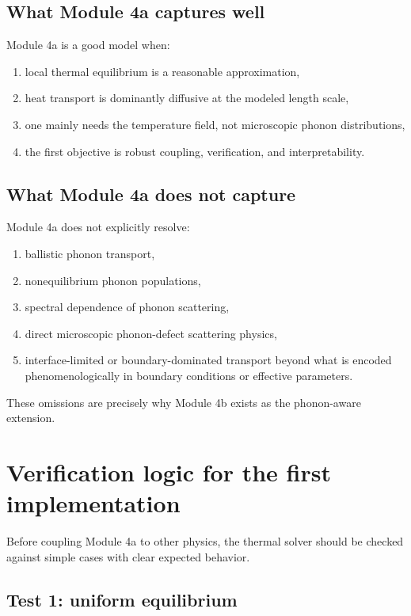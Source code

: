 \documentclass[11pt]{article}
\begin{document}
\subsection{What Module 4a captures well}

Module 4a is a good model when:
\begin{enumerate}[label=\arabic*.]
    \item local thermal equilibrium is a reasonable approximation,
    \item heat transport is dominantly diffusive at the modeled length scale,
    \item one mainly needs the temperature field, not microscopic phonon distributions,
    \item the first objective is robust coupling, verification, and interpretability.
\end{enumerate}

\subsection{What Module 4a does not capture}

Module 4a does not explicitly resolve:
\begin{enumerate}[label=\arabic*.]
    \item ballistic phonon transport,
    \item nonequilibrium phonon populations,
    \item spectral dependence of phonon scattering,
    \item direct microscopic phonon-defect scattering physics,
    \item interface-limited or boundary-dominated transport beyond what is encoded phenomenologically in boundary conditions or effective parameters.
\end{enumerate}

These omissions are precisely why Module 4b exists as the phonon-aware extension.

\section{Verification logic for the first implementation}

Before coupling Module 4a to other physics, the thermal solver should be checked against simple cases with clear expected behavior.

\subsection{Test 1: uniform equilibrium}
\end{document}
